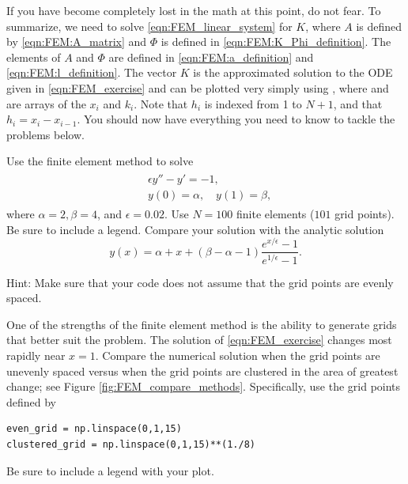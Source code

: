 If you have become completely lost in the math at this point, do not fear.
To summarize, we need to solve \ref{eqn:FEM_linear_system} for $K$, where $A$ is defined by \ref{eqn:FEM:A_matrix} and $\Phi$ is defined in \ref{eqn:FEM:K_Phi_definition}.
The elements of $A$ and $\Phi$ are defined in \ref{eqn:FEM:a_definition} and \ref{eqn:FEM:l_definition}.
The vector $K$ is the approximated solution to the ODE given in \ref{eqn:FEM_exercise} and can be plotted very simply using , where  and  are arrays of the \(x_i\) and \(k_i\).
Note that $h_i$ is indexed from 1 to $N+1$, and that $h_i=x_i-x_{i-1}$.
You should now have everything you need to know to tackle the problems below.


\begin{problem}
Use the finite element method to solve
\begin{align}
	\begin{split}
	&{ }\epsilon y'' - y' = -1,\\
	&{ }y(0) = \alpha, \quad y(1) = \beta,
	\end{split} \label{eqn:FEM_exercise}
\end{align}
where $\alpha = 2, \beta = 4$, and $\epsilon = 0.02$.
Use $N = 100$ finite elements ($101$ grid points).
Be sure to include a legend.
Compare your solution with the analytic solution
\[y(x) = \alpha + x + (\beta - \alpha - 1 ) \frac{e^{x/\epsilon} -1}{e^{1/\epsilon} -1}.\]

Hint: Make sure that your code does not assume that the grid points are evenly spaced.
\end{problem}

\begin{problem}
One of the strengths of the finite element method is the ability to generate grids that better suit the problem.
The solution of \eqref{eqn:FEM_exercise} changes most rapidly near $x = 1$.
Compare the numerical solution when the grid points are unevenly spaced versus when the grid points are clustered in the area of greatest change; see Figure \ref{fig:FEM_compare_methods}. Specifically, use the grid points defined by
\begin{lstlisting}
even_grid = np.linspace(0,1,15)
clustered_grid = np.linspace(0,1,15)**(1./8)
\end{lstlisting}
Be sure to include a legend with your plot.
\end{problem}

